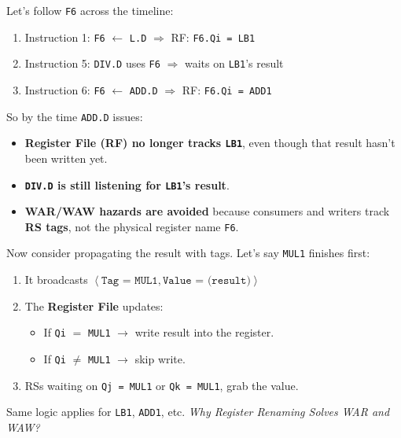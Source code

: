 \begin{examplebox}
    \noindent
    Let's follow \texttt{F6} across the timeline:
    \begin{enumerate}
        \item Instruction 1: \texttt{F6} $\leftarrow$ \texttt{L.D} $\Rightarrow$ RF: \texttt{F6.Qi = LB1}
        \item Instruction 5: \texttt{DIV.D} uses \texttt{F6} $\Rightarrow$ waits on \texttt{LB1}'s result
        \item Instruction 6: \texttt{F6} $\leftarrow$ \texttt{ADD.D} $\Rightarrow$ RF: \texttt{F6.Qi = ADD1}
    \end{enumerate}
    So by the time \texttt{ADD.D} issues:
    \begin{itemize}
        \item \textbf{Register File (RF) no longer tracks \texttt{LB1}}, even though that result hasn't been written yet.
        \item \textbf{\texttt{DIV.D} is still listening for \texttt{LB1}'s result}.
        \item \textbf{WAR/WAW hazards are avoided} because consumers and writers track \textbf{RS tags}, not the physical register name \texttt{F6}.
    \end{itemize}
    Now consider propagating the result with tags. Let's say \texttt{MUL1} finishes first:
    \begin{enumerate}
        \item It broadcasts $\left\langle\texttt{Tag = MUL1}, \texttt{Value = (result)}\right\rangle$
        \item The \textbf{Register File} updates:
        \begin{itemize}
            \item If \texttt{Qi} $=$ \texttt{MUL1} $\rightarrow$ write result into the register.
            \item If \texttt{Qi} $\ne$ \texttt{MUL1} $\rightarrow$ skip write.
        \end{itemize}
        \item RSs waiting on \texttt{Qj = MUL1} or \texttt{Qk = MUL1}, grab the value.
    \end{enumerate}
    Same logic applies for \texttt{LB1}, \texttt{ADD1}, etc. \emph{Why Register Renaming Solves WAR and WAW?}
    \begin{center}
        \begin{adjustbox}{width={\textwidth},totalheight={\textheight},keepaspectratio}
            \begin{tabular}{@{} c | p{13.5em} | p{13.5em} @{}}

\end{tabular}
\end{adjustbox}
\end{center}
\end{examplebox}
